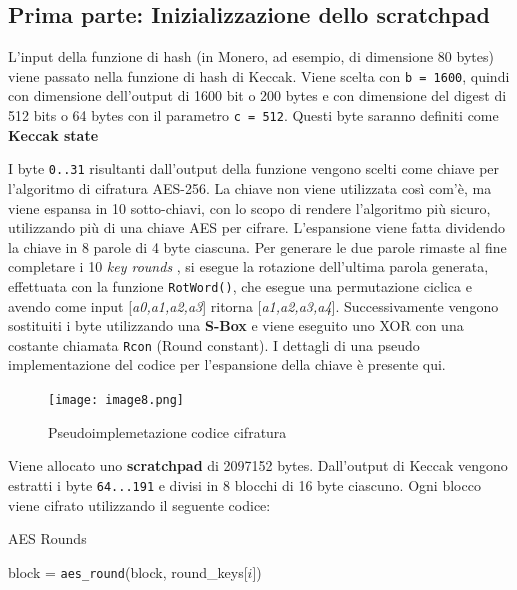 \subsection{Prima parte: Inizializzazione dello
scratchpad}\label{prima-parte-inizializzazione-dello-scratchpad}

L'input della funzione di hash (in Monero, ad esempio, di dimensione 80
bytes) viene passato nella funzione di hash di Keccak\cite{bertoni2011keccak}. Viene scelta con
\texttt{b\ =\ 1600}, quindi con dimensione dell'output di 1600 bit o 200
bytes e con dimensione del digest di 512 bits o 64 bytes con il
parametro \texttt{c\ =\ 512}. Questi byte saranno definiti come
\textbf{Keccak state} \cite{keccak_parameters}

I byte \texttt{0..31} risultanti dall'output della funzione vengono
scelti come chiave per l'algoritmo di cifratura AES-256. La chiave non
viene utilizzata così com'è, ma viene espansa\cite{standard2001federal} in 10 sotto-chiavi, con lo
scopo di rendere l'algoritmo più sicuro, utilizzando più di una chiave
AES per cifrare. L'espansione viene fatta dividendo la chiave in 8
parole di 4 byte ciascuna. Per generare le due parole rimaste al fine
completare i 10 \emph{key rounds} , si esegue la rotazione
dell'ultima parola generata, effettuata con la funzione
\texttt{RotWord()}, che esegue una permutazione ciclica e avendo come
input {[}\emph{a0,a1,a2,a3}{]} ritorna {[}\emph{a1,a2,a3,a4}{]}.
Successivamente vengono sostituiti i byte utilizzando una \textbf{S-Box}
e viene eseguito uno XOR con una costante chiamata \texttt{Rcon} (Round
constant). I dettagli di una pseudo implementazione del codice per
l'espansione della chiave è presente qui.

\begin{figure}[h!]
  \centering
  \texttt{[image: image8.png]}
  \caption{Pseudoimplemetazione codice cifratura}
\end{figure}
\newpage

Viene allocato uno \textbf{scratchpad} di 2097152 bytes.\cite{crypto_note_standard_cryptonight}
Dall'output di Keccak vengono estratti i byte \texttt{64...191} e divisi
in 8 blocchi di 16 byte ciascuno. Ogni blocco viene cifrato utilizzando
il seguente codice:

\begin{algorithm}
  \caption{AES Rounds}
  \begin{algorithmic}[1]
      \State block = \texttt{aes\_round}(block, round\_keys[$i$])
  \EndFor
  \end{algorithmic}
  \end{algorithm}


